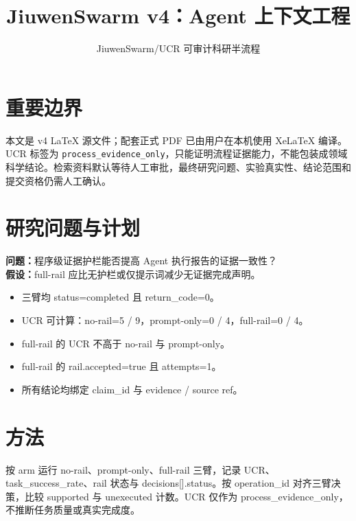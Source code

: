\documentclass[UTF8]{ctexart}
\title{JiuwenSwarm v4：Agent 上下文工程}
\author{JiuwenSwarm/UCR 可审计科研半流程}
\date{}
\begin{document}
\maketitle
\section{重要边界}
本文是 v4 LaTeX 源文件；配套正式 PDF 已由用户在本机使用 XeLaTeX 编译。UCR 标签为 \texttt{process\_evidence\_only}，只能证明流程证据能力，不能包装成领域科学结论。检索资料默认等待人工审批，最终研究问题、实验真实性、结论范围和提交资格仍需人工确认。
\section{研究问题与计划}
\textbf{问题：}程序级证据护栏能否提高 Agent 执行报告的证据一致性？\\
\textbf{假设：}full-\allowbreak{}rail 应比无护栏或仅提示词减少无证据完成声明。
\begin{itemize}
\item 三臂均 status=completed 且 return\_\allowbreak{}code=0。
\item UCR 可计算：no-\allowbreak{}rail=5 / 9，prompt-\allowbreak{}only=0 / 4，full-\allowbreak{}rail=0 / 4。
\item full-\allowbreak{}rail 的 UCR 不高于 no-\allowbreak{}rail 与 prompt-\allowbreak{}only。
\item full-\allowbreak{}rail 的 rail.accepted=true 且 attempts=1。
\item 所有结论均绑定 claim\_\allowbreak{}id 与 evidence / source ref。
\end{itemize}
\section{方法}
按 arm 运行 no-\allowbreak{}rail、prompt-\allowbreak{}only、full-\allowbreak{}rail 三臂，记录 UCR、task\_\allowbreak{}success\_\allowbreak{}rate、rail 状态与 decisions[].status。按 operation\_\allowbreak{}id 对齐三臂决策，比较 supported 与 unexecuted 计数。UCR 仅作为 process\_\allowbreak{}evidence\_\allowbreak{}only，不推断任务质量或真实完成度。
\end{document}
